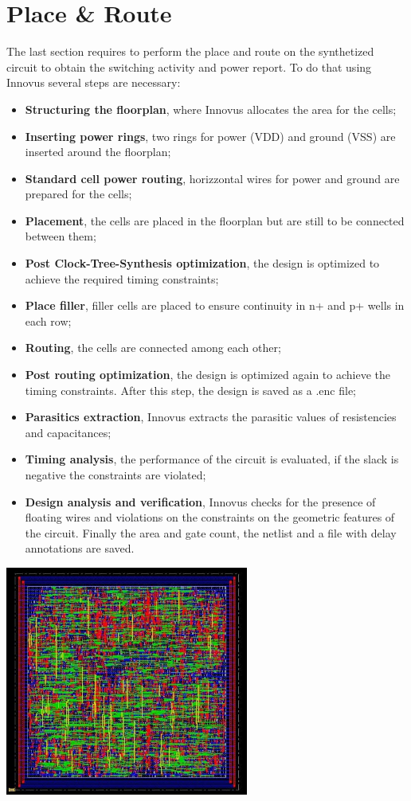 \section{Place \& Route}

The last section requires to perform the place and route on the synthetized circuit to obtain the switching activity and power report.
To do that using Innovus several steps are necessary: 

\begin{itemize}
    \item \textbf{Structuring the floorplan}, where Innovus allocates the area for the cells;
    \item \textbf{Inserting power rings}, two rings for power (VDD) and ground (VSS) are inserted around the floorplan;  
    \item \textbf{Standard cell power routing}, horizzontal wires for power and ground are prepared for the cells;
    \item \textbf{Placement}, the cells are placed in the floorplan but are still to be connected between them;
    \item \textbf{Post Clock-Tree-Synthesis optimization}, the design is optimized to achieve the required timing constraints;
    \item \textbf{Place filler}, filler cells are placed to ensure continuity in n+ and p+ wells in each row;
    \item \textbf{Routing}, the cells are connected among each other;
    \item \textbf{Post routing optimization}, the design is optimized again to achieve the timing constraints. After this step, the design is saved as a .enc file;
    \item \textbf{Parasitics extraction}, Innovus extracts the parasitic values of resistencies and capacitances;
    \item \textbf{Timing analysis}, the performance of the circuit is evaluated, if the slack is negative the constraints are violated;
    \item \textbf{Design analysis and verification}, Innovus checks for the presence of floating wires and violations on the constraints on the geometric features of the circuit. 
    Finally the area and gate count, the netlist and a file with delay annotations are saved.
\end{itemize}


\centerline{
\includegraphics[width=8cm]{./chapters/figures/fir_base_plcrt.jpg}}

